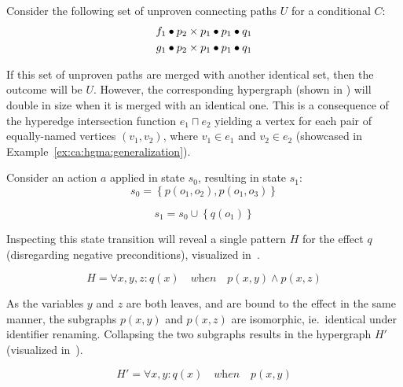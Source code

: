 \documentclass[../Master.tex]{subfiles}
\begin{document}
\begin{example}\label{ex:ca:hgma:ex:collapsing}
    
    Consider the following set of unproven connecting paths $U$ for a conditional $C$:
    \begin{align*}
        f_1 \bullet p_2 \times p_1 \bullet p_1 \bullet q_1 \\
        g_1 \bullet p_2 \times p_1 \bullet p_1 \bullet q_1
    \end{align*}

    If this set of unproven paths are merged with another identical set, then the outcome will be $U$. However, the corresponding hypergraph (shown in ) will double in size when it is merged with an identical one. This is a consequence of the hyperedge intersection function $e_1 \sqcap e_2$ yielding a vertex for each pair of equally-named vertices $\left(v_1, v_2\right)$, where $v_1 \in e_1$ and $v_2 \in e_2$ (showcased in Example~\ref{ex:ca:hgma:generalization}).

	Consider an action $a$ applied in state $s_0$, resulting in state $s_1$:
	\begin{equation*}
		s_0 = \left\{ 
			p\left(o_1, o_2\right), p\left(o_1, o_3\right)
		\right\}
	\end{equation*}

	\begin{equation*}
		s_1 = s_0 \cup \left\{
			q\left( o_1 \right)
		\right\}
	\end{equation*}

	Inspecting this state transition will reveal a single pattern $H$ for the effect $q$ (disregarding negative preconditions), visualized in~.

    \begin{equation*}
        H = \forall x, y, z : q(x) \quad \textit{when} \quad
            p(x,y) \land p(x,z)
    \end{equation*}

	As the variables $y$ and $z$ are both leaves, and are bound to the effect in the same manner, the subgraphs $p(x,y)$ and $p(x,z)$ are isomorphic, ie.\ identical under identifier renaming. Collapsing the two subgraphs results in the hypergraph $H'$ (visualized in~).
	
    \begin{equation*}
        H' = \forall x, y : q(x) \quad \textit{when} \quad p(x,y)
    \end{equation*}


\end{example}
\end{document}
